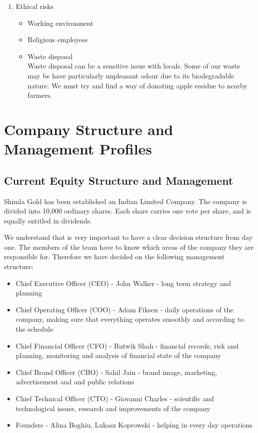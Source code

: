 \documentclass[11pt]{article}
\begin{document}
\begin{enumerate}
  \item Ethical risks
    \begin{itemize}
    \item Working environment
    \item Religious employees
    \item Waste disposal \\
Waste disposal can be a sensitive issue with locals. Some of our waste may be have particularly unpleasant odour due to its biodegradable nature. We must try and find a way of donating apple residue to nearby farmers.
    \end{itemize}
  \end{enumerate}

\newpage
\section{Company Structure and Management Profiles}

  \subsection{Current Equity Structure and Management}
  Shimla Gold has been established an Indian Limited Company. The company is divided into 10,000 ordinary shares. Each share carries one vote per share, and is equally entitled in dividends.


  We understand that is very important to have a clear decision structure from day one.
  The members of the team have to know which areas of the company they are responsible for.
  Therefore we have decided on the following management structure:
  \begin{itemize}
  \item Chief Executive Officer (CEO) - John Walker - long term strategy and planning
  \item Chief Operating Officer (COO) - Adam Fiksen - daily operations of the company, making sure that everything operates smoothly and according to the schedule
  \item Chief Financial Officer (CFO) - Rutwik Shah - financial records, risk and planning, monitoring and analysis of financial state of the company
  \item Chief Brand Officer (CBO) - Sahil Jain - brand image, marketing, advertisement and and public relations
  \item Chief Technical Officer (CTO) - Giovanni Charles - scientific and technological issues, research and improvements of the company
  \item Founders - Alina Boghiu, Lukasz Koprowski - helping in every day operations
  \end{itemize}
\end{document}
